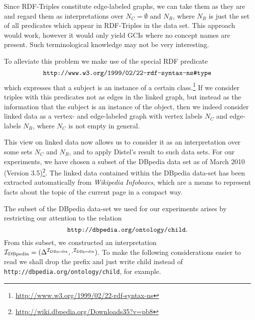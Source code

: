 Since RDF-Triples constitute edge-labeled graphs, we can take them as they are and regard
them as interpretations over $N_C = \emptyset$ and $N_R$, where $N_R$ is just the set of
all predicates which appear in RDF-Triples in the data set.  This approach would work,
however it would only yield GCIs where no concept names are present.  Such terminological
knowledge may not be very interesting.

To alleviate this problem we make use of the special RDF predicate
\begin{equation}
  \label{eq:16}
  \verb|http://www.w3.org/1999/02/22-rdf-syntax-ns#type|
\end{equation}
which expresses that a subject is an instance of a certain
class.\footnote{\url{http://www.w3.org/1999/02/22-rdf-syntax-ns}} If we consider triples
with this predicates not as edges in the linked graph, but instead as the information that
the subject is an instance of the object, then we indeed consider linked data as a vertex-
and edge-labeled graph with vertex labels $N_C$ and edge-labels $N_R$, where $N_C$ is not
empty in general.

This view on linked data now allows us to consider it as an interpretation over some sets
$N_C$ and $N_R$, and to apply Distel's result to such data sets.  For our experiments, we
have chosen a subset of the DBpedia data set as of March 2010 (Version
3.5)\footnote{\url{http://wiki.dbpedia.org/Downloads35?v=pb8}}.  The linked data contained
within the DBpedia data-set has been extracted automatically from \emph{Wikipedia
  Infoboxes}, which are a means to represent facts about the topic of the current page in
a compact way.

The subset of the DBpedia data-set we used for our experiments arises by restricting our
attention to the relation
\begin{equation*}
  \verb|http://dbpedia.org/ontology/child|.
\end{equation*}
From this subset, we constructed an interpretation ${\mathcal{I}_{\text{DBpedia}}} = (\Delta^{{\mathcal{I}_{\text{DBpedia}}}},
\cdot^{{\mathcal{I}_{\text{DBpedia}}}})$.  To make the following considerations easier to read we shall drop
the prefix and just write \textsf{child} instead of
\texttt{http://dbpedia.org/ontology/child}, for example.

